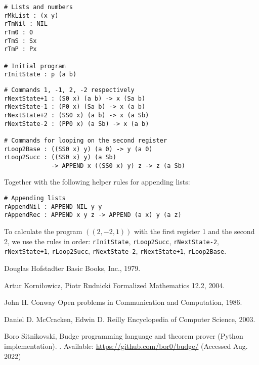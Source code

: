 \documentclass{article}
\begin{document}
\begin{minipage}{0.40\textwidth}
\begin{verbatim}
# Lists and numbers
rMkList : (x y)
rTmNil : NIL
rTm0 : 0
rTmS : Sx
rTmP : Px

# Initial program
rInitState : p (a b)
\end{verbatim}
\end{minipage}
\begin{minipage}{0.58\textwidth}
\begin{verbatim}
# Commands 1, -1, 2, -2 respectively
rNextState+1 : (S0 x) (a b) -> x (Sa b)
rNextState-1 : (P0 x) (Sa b) -> x (a b)
rNextState+2 : (SS0 x) (a b) -> x (a Sb)
rNextState-2 : (PP0 x) (a Sb) -> x (a b)

# Commands for looping on the second register
rLoop2Base : ((SS0 x) y) (a 0) -> y (a 0)
rLoop2Succ : ((SS0 x) y) (a Sb)
             -> APPEND x ((SS0 x) y) z -> z (a Sb)
\end{verbatim}
\end{minipage}

Together with the following helper rules for appending lists:

\begin{verbatim}
# Appending lists
rAppendNil : APPEND NIL y y
rAppendRec : APPEND x y z -> APPEND (a x) y (a z)
\end{verbatim}

To calculate the program $((2, -2, 1))$ with the first register 1 and the second 2, we use the rules in order: \texttt{rInitState}, \texttt{rLoop2Succ}, \texttt{rNextState-2}, \texttt{rNextState+1}, \texttt{rLoop2Succ}, \texttt{rNextState-2}, \texttt{rNextState+1}, \texttt{rLoop2Base}.

\begin{thebibliography}{1}

Douglas Hofstadter
\newblock Basic Books, Inc., 1979.

Artur Korniłowicz, Piotr Rudnicki
\newblock Formalized Mathematics 12.2, 2004.

John H. Conway
\newblock Open problems in Communication and Computation, 1986.

Daniel D. McCracken, Edwin D. Reilly
\newblock Encyclopedia of Computer Science, 2003.

Boro Sitnikovski,
\newblock Budge programming language and theorem prover (Python implementation).
\newblock [Online]. Available: \url{https://github.com/bor0/budge/} (Accessed Aug. 2022)

\end{thebibliography}
\end{document}

